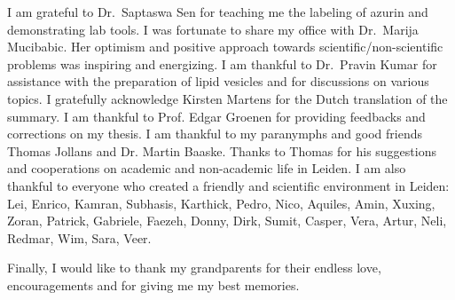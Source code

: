 I am grateful to Dr.~Saptaswa Sen for teaching me the labeling of azurin and demonstrating lab tools.
I was fortunate to share my office with Dr.~Marija Mucibabic. Her optimism and positive approach towards scientific/non-scientific problems was inspiring and energizing.
I am thankful to Dr.~Pravin Kumar for assistance with the preparation of lipid vesicles and for discussions on various topics.
I gratefully acknowledge Kirsten Martens for the Dutch translation of the summary.
I am thankful to Prof. Edgar Groenen for providing feedbacks and corrections on my thesis.
I am thankful to my paranymphs and good friends Thomas Jollans and Dr. Martin Baaske.
Thanks to Thomas for his suggestions and cooperations on academic and non-academic life in Leiden.
I am also thankful to everyone who created a friendly and scientific environment in Leiden: Lei, Enrico, Kamran, Subhasis, Karthick, Pedro, Nico, Aquiles, Amin, Xuxing, Zoran, Patrick, Gabriele, Faezeh, Donny, Dirk, Sumit, Casper, Vera, Artur, Neli, Redmar, Wim, Sara, Veer.

Finally, I would like to thank my grandparents for their endless love, encouragements and for giving me my best memories.